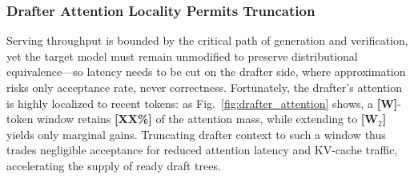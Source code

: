 \documentclass[sigconf,nonacm,10pt]{acmart}
\begin{document}
\subsubsection{Drafter Attention Locality Permits Truncation} \label{sec:oppo_draft}
Serving throughput is bounded by the critical path of generation and verification, yet the target model must remain unmodified to preserve distributional equivalence---so latency needs to be cut on the drafter side, where approximation risks only acceptance rate, never correctness. Fortunately, the drafter's attention is highly localized to recent tokens: as Fig.~\ref{fig:drafter_attention} shows, a {\color{red}\textbf{[W]}}-token window retains {\color{red}\textbf{[XX\%]}} of the attention mass, while extending to {\color{red}\textbf{[W$_2$]}} yields only marginal gains. Truncating drafter context to such a window thus trades negligible acceptance for reduced attention latency and KV-cache traffic, accelerating the supply of ready draft trees.

\end{document}
